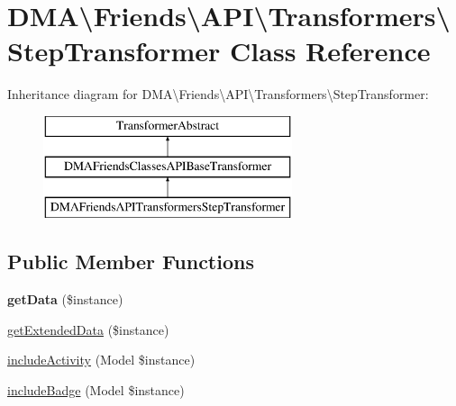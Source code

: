 \hypertarget{classDMA_1_1Friends_1_1API_1_1Transformers_1_1StepTransformer}{}\section{D\+M\+A\textbackslash{}Friends\textbackslash{}A\+P\+I\textbackslash{}Transformers\textbackslash{}Step\+Transformer Class Reference}
\label{classDMA_1_1Friends_1_1API_1_1Transformers_1_1StepTransformer}
Inheritance diagram for D\+M\+A\textbackslash{}Friends\textbackslash{}A\+P\+I\textbackslash{}Transformers\textbackslash{}Step\+Transformer\+:\begin{figure}[H]
\begin{center}
\leavevmode
\includegraphics[height=3.000000cm]{de/d3c/classDMA_1_1Friends_1_1API_1_1Transformers_1_1StepTransformer}
\end{center}
\end{figure}
\subsection*{Public Member Functions}
\begin{DoxyCompactItemize}
\item 
\hypertarget{classDMA_1_1Friends_1_1API_1_1Transformers_1_1StepTransformer_af598033e757246e05cb07b0e9256ef20}{}{\bfseries get\+Data} (\$instance)\label{classDMA_1_1Friends_1_1API_1_1Transformers_1_1StepTransformer_af598033e757246e05cb07b0e9256ef20}

\item 
\hyperlink{classDMA_1_1Friends_1_1API_1_1Transformers_1_1StepTransformer_aa09dd3be3937396f320a2d7827537818}{get\+Extended\+Data} (\$instance)
\item 
\hyperlink{classDMA_1_1Friends_1_1API_1_1Transformers_1_1StepTransformer_a8052fad1a0585b225720e12f619e01cf}{include\+Activity} (Model \$instance)
\item 
\hyperlink{classDMA_1_1Friends_1_1API_1_1Transformers_1_1StepTransformer_a5658c6eb2bff831cd21c37037b3b4978}{include\+Badge} (Model \$instance)
\end{DoxyCompactItemize}
